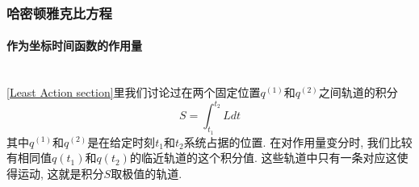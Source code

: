 \documentclass[a4paper,11pt]{article}
\begin{document}
\subsubsection{哈密顿雅克比方程}
\paragraph*{作为坐标时间函数的作用量}\quad\\
\ref{Least Action section}里我们讨论过在两个固定位置$q^{(1)}$和$q^{(2)}$之间轨道的积分
\begin{equation}\label{Action L}
  S=\int_{t_1}^{t_2}Ldt
\end{equation}
其中$q^{(1)}$和$q^{(2)}$是在给定时刻$t_1$和$t_2$系统占据的位置. 在对作用量变分时, 我们比较有相同值$q(t_1)$和$q(t_2)$的临近轨道的这个积分值. 这些轨道中只有一条对应这使得运动, 这就是积分$S$取极值的轨道.
\end{document}
